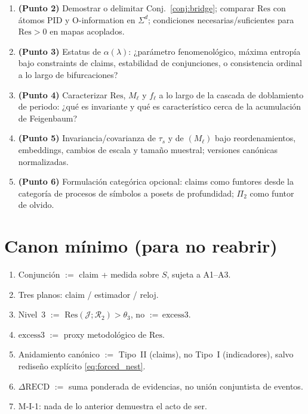 \documentclass[11pt,a4paper]{article}
\theoremstyle{definition}
\theoremstyle{plain}
\theoremstyle{remark}
\newcommand{\Res}{\mathrm{Res}}
\newcommand{\RECD}{\mathrm{RECD}}
\newcommand{\excess}{\mathrm{excess3}}
\newcommand{\Rtwo}{\mathcal{R}_2}
\newcommand{\Jwin}{\mathcal{J}}
\begin{document}
\begin{enumerate}[label=\textbf{A\arabic*.}]
  \item \textbf{(Punto 2)} Demostrar o delimitar Conj.~\ref{conj:bridge};
  comparar $\Res$ con \'atomos PID y O-information en $\Sigma^d$;
  condiciones necesarias/suficientes para $\Res>0$ en mapas acoplados.
  \item \textbf{(Punto 3)} Estatus de $\alpha(\lambda)$: ¿par\'ametro
  fenomenol\'ogico, m\'axima entrop\'ia bajo constraints de claims,
  estabilidad de conjunciones, o consistencia ordinal a lo largo de
  bifurcaciones?
  \item \textbf{(Punto 4)} Caracterizar $\Res$, $M_\ell$ y $f_\ell$ a lo
  largo de la cascada de doblamiento de periodo: ¿qu\'e es invariante y
  qu\'e es caracter\'istico cerca de la acumulaci\'on de Feigenbaum?
  \item \textbf{(Punto 5)} Invariancia/covarianza de $\tau_s$ y de
  $(M_\ell)$ bajo reordenamientos, embeddings, cambios de escala y
  tama\~no muestral; versiones can\'onicas normalizadas.
  \item \textbf{(Punto 6)} Formulaci\'on categ\'orica opcional: claims
  como funtores desde la categor\'ia de procesos de s\'imbolos a
  posets de profundidad; $\Pi_2$ como funtor de olvido.
\end{enumerate}

\section{Canon m\'inimo (para no reabrir)}
\label{sec:canon}

\begin{enumerate}[label=\textbf{C\arabic*.}]
  \item Conjunci\'on $:=$ claim + medida sobre $S$, sujeta a A1--A3.
  \item Tres planos: claim / estimador / reloj.
  \item Nivel~3 $:=$ $\Res(\Jwin;\Rtwo)>\theta_3$, no $:=\,\excess$.
  \item $\excess$ $:=$ proxy metodol\'ogico de $\Res$.
  \item Anidamiento can\'onico $:=$ Tipo~II (claims), no Tipo~I
  (indicadores), salvo redise\~no expl\'icito \eqref{eq:forced_nest}.
  \item $\Delta\RECD$ $:=$ suma ponderada de evidencias, no uni\'on
  conjuntista de eventos.
  \item M-I-1: nada de lo anterior demuestra el acto de ser.
\end{enumerate}
\end{document}
